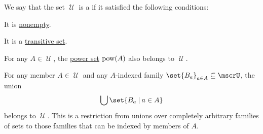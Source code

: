 \begin{definition}\label{def:grothendieck_universe}
  We say that the set \( \mscrU \) is a  if it satisfied the following conditions:
  \begin{thmenum}
     It is \hyperref[def:empty_set]{nonempty}.

     It is a \hyperref[def:transitive_set]{transitive set}.

     For any \( A \in \mscrU \), the \hyperref[def:basic_set_operations/power_set]{power set} \( \operatorname{pow}(A) \) also belongs to \( \mscrU \).

     For any member \( A \in \mscrU \) and any \( A \)-indexed family \( \set{ B_a }_{a \in A} \subseteq \mscrU \), the union
    \begin{equation*}
      \bigcup\set{ B_a \given a \in A }
    \end{equation*}
    belongs to \( \mscrU \). This is a restriction from unions over completely arbitrary families of sets to those families that can be indexed by members of \( A \).
  \end{thmenum}


\end{definition}
